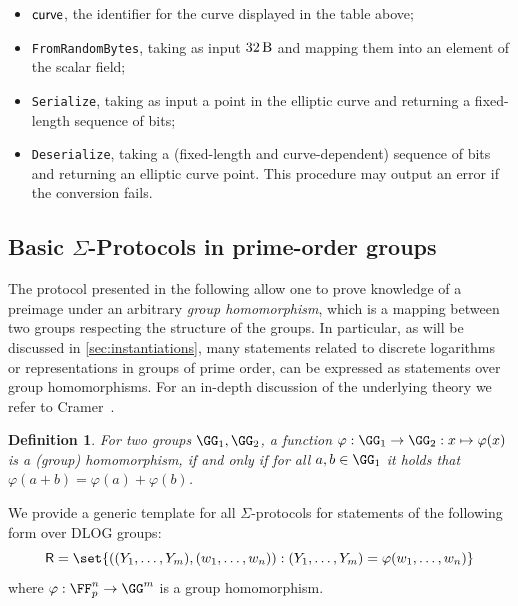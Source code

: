 \documentclass[11pt]{article}
\newtheorem{definition}{Definition}
\begin{document}
\begin{itemize}
  \item $\textsf{curve}$, the identifier for the curve displayed in the table above;
  \item \texttt{FromRandomBytes}, taking as input $\seedlen$ and mapping them into an element of the scalar field;
  \item \texttt{Serialize}, taking as input a point in the elliptic curve and returning a fixed-length sequence of bits;
  \item \texttt{Deserialize}, taking a (fixed-length and curve-dependent) sequence of bits and returning an elliptic curve point. This procedure may output an error if the conversion fails.
\end{itemize}


\subsection{Basic $\Sigma$-Protocols in prime-order groups}\label{sec:basic_sigma}

The protocol presented in the following allow one to prove knowledge of a preimage under an arbitrary \emph{group homomorphism}, which is a mapping between two groups respecting the structure of the groups.
In particular, as will be discussed in \cref{sec:instantiations}, many statements related to discrete logarithms or representations in groups of prime order, can be expressed as statements over group homomorphisms.
For an in-depth discussion of the underlying theory we refer to Cramer~\cite{cramer97}.

\begin{definition}
  For two groups $\GG_1,\GG_2$, a function $\varphi:\GG_1\to\GG_2:x\mapsto\varphi(x)$ is a \emph{(group) homomorphism}, if and only if for all $a,b\in\GG_1$ it holds that $\varphi(a+b)=\varphi(a)+\varphi(b)$.
\end{definition}



\label{sec:sigma-dlog}
We provide a generic template for all $\Sigma$-protocols for statements of the following form over DLOG groups:
\[
  \relation=\set{((\statement_1,\dots,\statement_m),(\witness_1,\dots,\witness_n)) : (\statement_1,\dots,\statement_m)=\varphi(\witness_1,\dots,\witness_n)}
\]
where $\varphi:\FF_p^n\to\GG^m$ is a group homomorphism.
\end{document}
